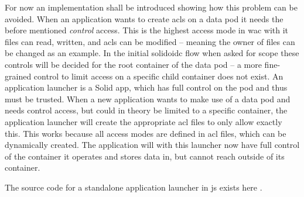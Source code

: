 For now an implementation shall be introduced showing how this problem can be avoided. When an application wants to create \glspl{acl} on a data pod it needs the before mentioned \textit{control} access. This is the highest access mode in \gls{wac} with it files can read, written, and \glspl{acl} can be modified -- meaning the owner of files can be changed as an example.
In the initial \gls{solidoidc} flow when asked for scope these controls will be decided for the root container of the data pod -- a more fine-grained control to limit access on a specific child container does not exist. An application launcher is a Solid app, which has full control on the pod and thus must be trusted. When a new application wants to make use of a data pod and needs control access, but could in theory be limited to a specific container, the application launcher will create the appropriate \gls{acl} files to only allow exactly this.
This works because all access modes are defined in \gls{acl} files, which can be dynamically created. The application will with this launcher now have full control of the container it operates and stores data in, but cannot reach outside of its container.

The source code for a standalone application launcher in \gls{js} exists here \cite{app-launcher}.